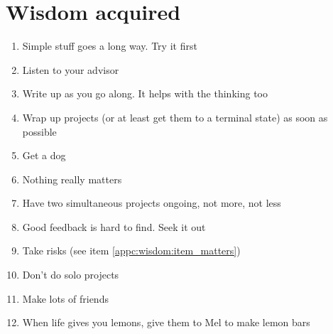 \graphicspath{{../Thesis/Appendix/appendixc/}}

\chapter{Wisdom acquired}
\label{apxc}

\begin{enumerate}
	\item Simple stuff goes a long way. Try it first
	\item Listen to your advisor
	\item Write up as you go along. It helps with the thinking too
	\item Wrap up projects (or at least get them to a terminal state) as soon as possible
	\item Get a dog
	\item Nothing really matters \label{appc:wisdom:item_matters}
	\item Have two simultaneous projects ongoing, not more, not less
	\item Good feedback is hard to find. Seek it out
	\item Take risks (see item \ref{appc:wisdom:item_matters})
	\item Don't do solo projects
	\item Make lots of friends
	\item When life gives you lemons, give them to Mel to make lemon bars
\end{enumerate}